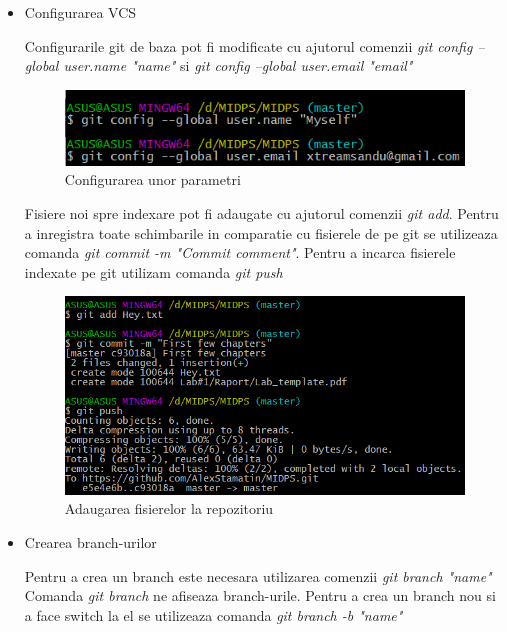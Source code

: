 \begin{itemize}
\item Configurarea VCS

Configurarile git de baza pot fi modificate cu ajutorul comenzii \textit{git config --global user.name "name"} si \textit{git config --global user.email "email"}

\begin{figure}[h!]
			\centering
 			 \includegraphics[scale=0.75]{"task 3 gitconfig"}
 			 \caption{Configurarea unor parametri}
 			 \label{fig:gitconfig}
		\end{figure}
		
Fisiere noi spre indexare pot fi adaugate cu ajutorul comenzii \textit{git add}. Pentru a inregistra toate schimbarile in comparatie cu fisierele de pe git se utilizeaza comanda \textit{git commit -m "Commit comment"}. Pentru a incarca fisierele indexate pe git utilizam comanda \textit{git push}

\begin{figure}[h!]
			\centering
 			 \includegraphics[scale=0.75]{"task 3 commit"}
 			 \caption{Adaugarea fisierelor la repozitoriu}
 			 \label{fig:commit}
		\end{figure}
		
\item Crearea branch-urilor

Pentru a crea un branch este necesara utilizarea comenzii \textit{git branch "name"} Comanda \textit{git branch} ne afiseaza branch-urile. Pentru a crea un branch nou si a face switch la el se utilizeaza comanda \textit{git branch -b "name"}


\end{itemize}
